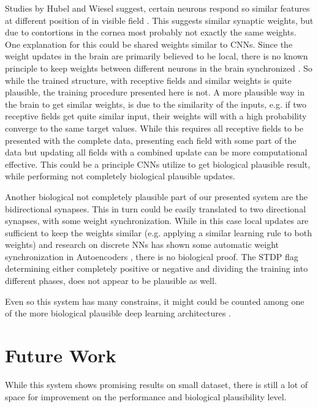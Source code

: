 Studies by Hubel and Wiesel suggest, certain neurons respond so similar features at different position of in visible field \cite{Hubel1959}.
This suggests similar synaptic weights, but due to contortions in the cornea most probably not exactly the same weights. 
One explanation for this could be shared weights similar to CNNs. 
Since the weight updates in the brain are primarily believed to be local, there is no known principle to keep weights between different neurons in the brain synchronized \cite{DBLP:journals/corr/ScellierB16}.
So while the trained structure, with receptive fields and similar weights is quite plausible, the training procedure presented here is not.
A more plausible way in the brain to get similar weights, is due to the similarity of the inputs, e.g. if two receptive fields get quite similar input, their weights will with a high probability converge to the same target values.  
While this requires all receptive fields to be presented with the complete data, presenting each field with some part of the data but updating all fields with a combined update can be more computational effective. 
This could be a principle CNNs utilize to get biological plausible result, while performing not completely biological plausible updates.

Another biological not completely plausible part of our presented system are the bidirectional synapses.
This in turn could be easily translated to two directional synapses, with some weight synchronization. 
While in this case local updates are sufficient to keep the weights similar (e.g. applying a similar learning rule to both weights) and research on discrete NNs has shown some automatic weight synchronization in Autoencoders \cite{vincent2010stacked}, there is no biological proof.
The STDP flag determining either completely positive or negative and dividing the training into different phases, does not appear to be plausible as well.

Even so this system has many constrains, it might could be counted among one of the more biological plausible deep learning architectures \cite{bengio2015towards}.     

\section{Future Work} \label{c:future}

While this system shows promising results on small dataset, there is still a lot of space for improvement on the performance and biological plausibility level.


